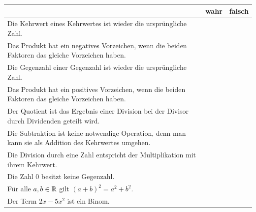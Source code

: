 \documentclass[11pt]{exam}
\begin{document}
\begin{questions}
{\begin{solution}
\end{solution}}
{\begingroup
	\renewcommand{\arraystretch}{1.5}
	\begin{table}[h]
		\centering
		\begin{tabular}{|p{12cm}|c|c|}\hline
			& wahr & falsch \\\hline
			Die Kehrwert eines Kehrwertes ist wieder die ursprüngliche Zahl. & & \\\hline
			Das Produkt hat ein negatives Vorzeichen, wenn die beiden Faktoren das gleiche Vorzeichen haben. & & \\\hline
			Die Gegenzahl einer Gegenzahl ist wieder die ursprüngliche Zahl. & & \\\hline
			Das Produkt hat ein positives Vorzeichen, wenn die beiden Faktoren das gleiche Vorzeichen haben. & & \\\hline
			Der Quotient ist das Ergebnis einer Division bei der Divisor durch Dividenden geteilt wird. & & \\\hline
			Die Subtraktion ist keine notwendige Operation, denn man kann sie als Addition des Kehrwertes umgehen. & & \\\hline
			Die Division durch eine Zahl entspricht der Multiplikation mit ihrem Kehrwert. & & \\\hline
			Die Zahl $0$ besitzt keine Gegenzahl. & & \\\hline
			Für alle $a,b\in\mathbb{R}$ gilt $(a+b)^2=a^2+b^2$. & & \\\hline
			Der Term $2x-5x^2$ ist ein Binom. & & \\\hline
		\end{tabular}
	\end{table}
	\endgroup}



\end{questions}
\end{document}
